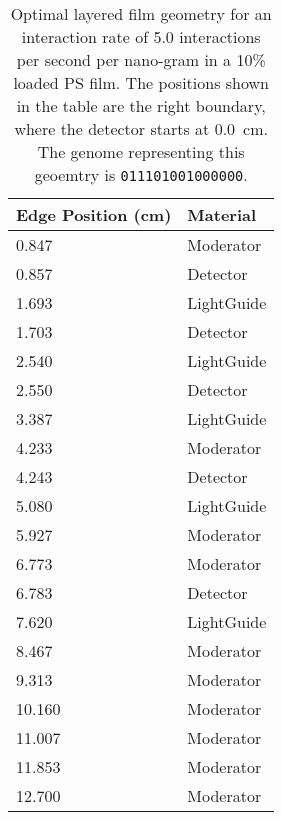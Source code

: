 \begin{table}
	\caption[Optimal Layered Film Geometry for 5.0 interaction per second per nanogram Cf-252]{Optimal layered film geometry for an interaction rate of 5.0 interactions per second per nano-gram   in a 10\%  loaded PS film. The positions shown in the table are the right boundary, where the detector starts at \SI{0.0}{\cm}. The genome representing this geoemtry is \texttt{011101001000000}.}
	\label{tab:OptGeoDetailed5}
	\begin{tabular}{m{3cm} m{4cm}}
	\toprule
	Edge Position (\si{\cm}) & Material \\
	\midrule
0.847&Moderator\\
0.857&Detector\\
1.693&LightGuide\\
1.703&Detector\\
2.540&LightGuide\\
2.550&Detector\\
3.387&LightGuide\\
4.233&Moderator\\
4.243&Detector\\
5.080&LightGuide\\
5.927&Moderator\\
6.773&Moderator\\
6.783&Detector\\
7.620&LightGuide\\
8.467&Moderator\\
9.313&Moderator\\
10.160&Moderator\\
11.007&Moderator\\
11.853&Moderator\\
12.700&Moderator\\
	\bottomrule
	\end{tabular}
\end{table}
